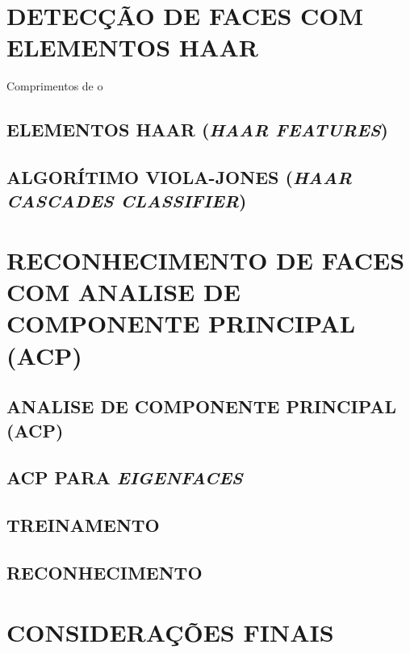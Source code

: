 

\section{DETECÇÃO DE FACES COM ELEMENTOS HAAR}\label{sec:detecao_faces}

Comprimentos de o


\subsection{ELEMENTOS HAAR (\textit{HAAR FEATURES}) }\label{subsubsec:elem_haar}


\subsection{ALGORÍTIMO VIOLA-JONES (\textit{HAAR CASCADES CLASSIFIER}) }\label{subsubsec:violajones}




\section{RECONHECIMENTO DE FACES COM ANALISE DE COMPONENTE PRINCIPAL (ACP) }\label{sec:recog_faces}


\subsection{ANALISE DE COMPONENTE PRINCIPAL (ACP)}\label{subsec:acp}


\subsection{ACP PARA \textit{EIGENFACES}}\label{subsec:acp-eigen}

\subsection{TREINAMENTO}\label{subsec:treiamento}

\subsection{RECONHECIMENTO}\label{subsec:reconhecimento}



\section{CONSIDERAÇÕES FINAIS}\label{sec:revbib_consid_finais}






















